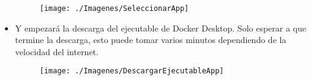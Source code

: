 \begin{itemize}
				\begin{figure}[htb]
					\begin{center}
						\texttt{[image: ./Imagenes/SeleccionarApp]}
					\end{center}
				\end{figure}
				\vspace{5cm}
			\item Y empezará la descarga del ejecutable de Docker Desktop. Solo esperar a que termine la descarga, esto puede tomar varios minutos dependiendo de la velocidad del internet.
				\begin{figure}[htb]
					\begin{center}
						\texttt{[image: ./Imagenes/DescargarEjecutableApp]}
					\end{center}
				\end{figure}

\end{itemize}
